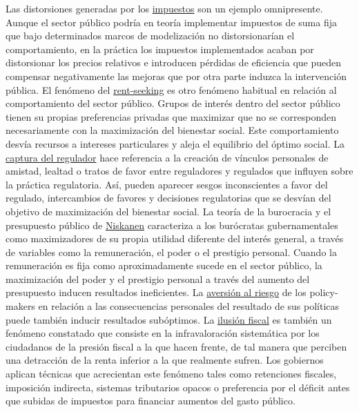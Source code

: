 \documentclass{nuevotema}
\begin{document}
Las distorsiones generadas por los \underline{impuestos} son un ejemplo omnipresente. Aunque el sector público podría en teoría implementar impuestos de suma fija que bajo determinados marcos de modelización no distorsionarían el comportamiento, en la práctica los impuestos implementados acaban por distorsionar los precios relativos e introducen pérdidas de eficiencia que pueden compensar negativamente las mejoras que por otra parte induzca la intervención pública. El fenómeno del \underline{rent-seeking} es otro fenómeno habitual en relación al comportamiento del sector público. Grupos de interés dentro del sector público tienen su propias preferencias privadas que maximizar que no se corresponden necesariamente con la maximización del bienestar social. Este comportamiento desvía recursos a intereses particulares y aleja el equilibrio del óptimo social. La \underline{captura del regulador} hace referencia a la creación de vínculos personales de amistad, lealtad o tratos de favor entre reguladores y regulados que influyen sobre la práctica regulatoria. Así, pueden aparecer sesgos inconscientes a favor del regulado, intercambios de favores y decisiones regulatorias que se desvían del objetivo de maximización del bienestar social. La teoría de la burocracia y el presupuesto público de \underline{Niskanen} caracteriza a los burócratas gubernamentales como maximizadores de su propia utilidad diferente del interés general, a través de variables como la remuneración, el poder o el prestigio personal. Cuando la remuneración es fija como aproximadamente sucede en el sector público, la maximización del poder y el prestigio personal a través del aumento del presupuesto inducen resultados ineficientes. La \underline{aversión al riesgo} de los policy-makers en relación a las consecuencias personales del resultado de sus políticas puede también inducir resultados subóptimos. La \underline{ilusión fiscal} es también un fenómeno constatado que consiste en la infravaloración sistemática por los ciudadanos de la presión fiscal a la que hacen frente, de tal manera que perciben una detracción de la renta inferior a la que realmente sufren. Los gobiernos aplican técnicas que acrecientan este fenómeno tales como retenciones fiscales, imposición indirecta, sistemas tributarios opacos o preferencia por el déficit antes que subidas de impuestos para financiar aumentos del gasto público.
\end{document}
